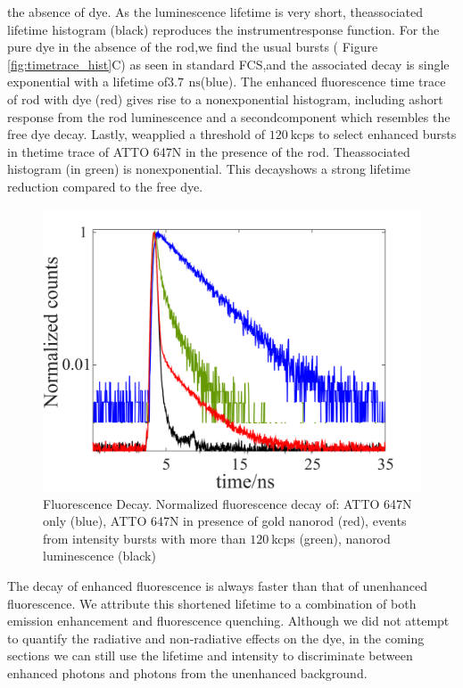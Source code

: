 \documentclass[journal=jpccck,manuscript=article]{achemso}
\newcommand{\ns}{\ensuremath{\,\textrm{ns}}}
\begin{document}
the absence of dye. As the luminescence lifetime is very short, theassociated lifetime histogram (black) 
reproduces the instrumentresponse function. For the pure dye in the absence of the rod,we ﬁnd the usual 
bursts ( Figure \ref{fig:timetrace_hist}C) as seen in standard FCS,and the associated decay is single exponential 
with a lifetime of$3.7~$\ns (blue). The enhanced ﬂuorescence time trace of rod with dye (red) gives rise to a 
nonexponential histogram, including ashort response from the rod luminescence and a secondcomponent which resembles 
the free dye decay. Lastly, weapplied a threshold of $120~$kcps to select enhanced bursts in thetime trace of 
ATTO 647N in the presence of the rod. Theassociated histogram (in green) is nonexponential. This decayshows a strong 
lifetime reduction compared to the free dye.\\
\begin{figure}
	\centering
	\includegraphics[]{lifetime_enhnc.png}
	\caption{Fluorescence Decay. Normalized fluorescence decay of: ATTO 647N only (blue), ATTO 647N in presence of 
	gold nanorod (red), events from intensity bursts with more than $120~$kcps (green), nanorod luminescence (black)}
	\label{fig:lifetime_enhnc}
\end{figure}
The decay of enhanced fluorescence is always faster than that of unenhanced fluorescence. We attribute this shortened 
lifetime to a combination of both emission enhancement and fluorescence quenching. Although we did not attempt to 
quantify the radiative and non-radiative effects on the dye, in the coming sections we can still use the lifetime 
and intensity to discriminate between enhanced photons and photons from the unenhanced background.\\
\end{document}
